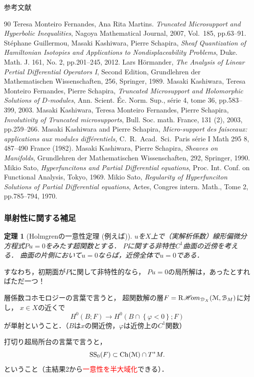 \documentclass[dvipdfmx,10pt,aspectratio=169,leqno]{beamer}%
\newcommand{\mcal}{\mathcal}
\numberwithin{equation}{subsection}
\newcommand{\cB}{\mcal{B}}
\newcommand{\cD}{\mcal{D}}
\newcommand{\cM}{\mcal{M}}
\newcommand{\HOM}{\mathop{\mathscr{H}\hspace{-2pt}om}\nolimits}%
\newcommand{\RHOM}{\mathop{\mathrm{R}\hspace{-1.5pt}\HOM}\nolimits}
\newcommand{\muS}[1][]{\mathop{\mathrm{SS}}\nolimits_{#1}}
\newcommand{\cotb}[1][]{T^{\ast}{#1}}
\theoremstyle{mystyle}
\newtheorem{THM}[AXM]{定理}
\begin{document}
\begin{frame}[allowframebreaks]{参考文献}
  \begin{thebibliography}{90}\beamertemplatetextbibitems
   Teresa Monteiro Fernandes, Ana Rita Martins. 
  \textit{Truncated Microsupport and Hyperbolic Inequalities}, 
  Nagoya Mathematical Journal, 2007, Vol.\ 185, pp.63--91. 
   St\'ephane Guillermou, 
  Masaki Kashiwara, Pierre Schapira, 
  \textit{Sheaf Quantization of Hamiltonian Isotopies and Applications to Nondisplaceability Problems}, 
  Duke. Math. J. 161, No. 2, pp.201--245, 2012.  
   Lars H\"ormander, 
  \textit{The Analysis of Linear Pertial Differential Operators I}, Second Edition,
  Grundlehren der Mathematischen Wissenschaften, 256, Springer, 1989.
   Masaki Kashiwara, Teresa Monteiro Fernandes, Pierre Schapira, 
  \textit{Truncated Microsupport and Holomorphic Solutions 
  of \(D\)-modules}, 
  Ann. Scient. \'Ec. Norm. Sup., s\'erie 4, tome 36, 
  pp.583--399, 2003.
   Masaki Kashiwara, Teresa Monteiro Fernandes, Pierre Schapira, 
  \textit{Involutivity of Truncated microsupports}, 
  Bull. Soc. math. France, 131 (2), 2003, 
  pp.259--266.
   Masaki Kashiwara and Pierre Schapira,
  \textit{Micro-support des faisceaux: applications 
  aux modules diff{\'e}rentiels,}
  C.~R.~Acad.\ Sci.\ Paris s{\'e}rie I Math 295 8, 487--490 France (1982).
   Masaki Kashiwara, Pierre Schapira, 
  \textit{Sheaves on Manifolds}, 
  Grundlehren der Mathematischen Wissenschaften, 292, Springer, 1990.
   Mikio Sato, 
  \textit{Hyperfuncitons and 
  Partial Differential equations}, 
  Proc. Int. Conf. on Functional Analysis, Tokyo, 1969.
   Mikio Sato, 
  \textit{Regularity of Hyperfunciton Solutions of 
  Partial Differential equations}, 
  Actes, Congres intern. Math., 
  Tome 2, pp.785--794, 1970.
\end{thebibliography}
\end{frame}

\begin{frame}
  \frametitle{単射性に関する補足}
  \begin{THM}[Holmgrenの一意性定理 (例えば{\cite[Theorem 8.6.5]{Hor90}})]
    \(u\)を\(X\)上で（実解析係数）線形偏微分方程式\(Pu=0\)をみたす超関数とする．
    \(P\)に関する非特性\(C^1\)曲面の近傍を考える．
    曲面の片側において\(u=0\)ならば，近傍全体で\(u=0\)である．
  \end{THM}
  すなわち，初期面が\(P\)に関して非特性的なら，
  \(Pu=0\)の局所解は，あったとすればただ一つ！
  
  層係数コホモロジーの言葉で言うと，
  超関数解の層\(F=\RHOM_{\cD_{X}}(\cM,\cB_{M})\)に対し，
  \(x\in X\)の近くで
  \[
    H^{0}(B;F)\to H^{0}(B\cap \left\{\varphi<0\right\};F)
  \]
  が単射ということ．（\(B\)は\(x\)の開近傍，\(\varphi\)は近傍上の\(C^{1}\)関数）

  打切り超局所台の言葉で言うと，
  \[
    \muS[0](F)\subset \Char(\cM)\cap \cotb[M].
  \]
  ということ（主結果2から\textcolor{red}{一意性を半大域化}できる）．
\end{frame}
\end{document}
